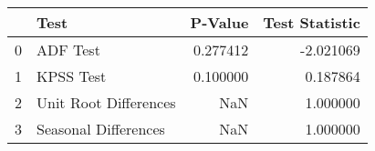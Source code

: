 \documentclass{article}
\begin{document}
\begin{center}
\begin{tabular}{llrr}
    \toprule
    {} &                   Test &   P-Value &  Test Statistic \\
    \midrule
    0 &               ADF Test &  0.277412 &       -2.021069 \\
    1 &              KPSS Test &  0.100000 &        0.187864 \\
    2 &  Unit Root Differences &       NaN &        1.000000 \\
    3 &   Seasonal Differences &       NaN &        1.000000 \\
    \bottomrule
\end{tabular}
\end{center}
\end{document}
